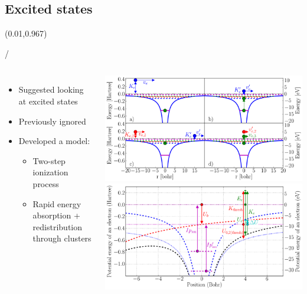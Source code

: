 \documentclass{beamer}
\makeatletter
\newcommand{\framenumber}{
\begin{textblock}{0}(0.01,0.967)
\begin{scriptsize}
{\color{gray}\insertframenumber/\inserttotalframenumber}
\end{scriptsize}
\end{textblock}
}
\makeatother
\begin{document}
\subsection{Excited states}
\begin{frame}{}\framenumber
\begin{columns}
        \begin{itemize}
        \item Suggested looking at excited states
        \item Previously ignored
        \item Developed a model:
            \begin{itemize}
            \item Two-step ionization process
            \item Rapid energy absorption + redistribution through clusters
            \end{itemize}
        \end{itemize}
    \centering
        \hspace{-21pt}\includegraphics[width=1.1\textwidth]{../figures/ionization_aci} \\
        \hspace{-21pt}\includegraphics[width=1.1\textwidth]{figures/potential_landscape}
\end{columns}
{}
\end{frame}
\end{document}
